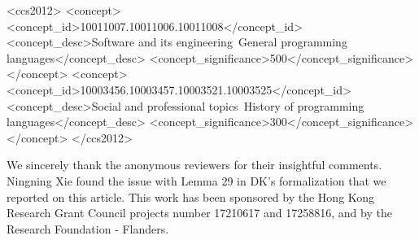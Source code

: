 \documentclass[acmsmall]{acmart}\settopmatter{}
\begin{document}
\begin{CCSXML}
<ccs2012>
<concept>
<concept_id>10011007.10011006.10011008</concept_id>
<concept_desc>Software and its engineering~General programming languages</concept_desc>
<concept_significance>500</concept_significance>
</concept>
<concept>
<concept_id>10003456.10003457.10003521.10003525</concept_id>
<concept_desc>Social and professional topics~History of programming languages</concept_desc>
<concept_significance>300</concept_significance>
</concept>
</ccs2012>
\end{CCSXML}





\maketitle



%







\begin{acks}                            %

We sincerely thank the anonymous reviewers for their insightful
comments. Ningning Xie found the issue with Lemma 29 in DK's formalization that we reported 
on this article. This work has been sponsored by the Hong Kong Research
Grant Council projects number 17210617 and 17258816, and by the
Research Foundation - Flanders.
\end{acks}





\newpage
\appendix

\end{document}
